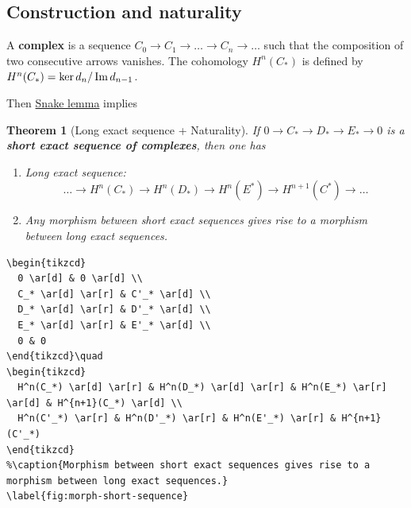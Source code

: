 \documentclass[11pt]{article}
\newtheorem{theorem}{Theorem}
\newcommand{\im}{\mathop{\rm Im}\nolimits}
\begin{document}
\subsection{Construction and naturality}
\label{sec:org1a74cb6}
  A \textbf{complex} is a sequence \(C_0 \longrightarrow C_1 \longrightarrow \dots \longrightarrow C_n
\longrightarrow \dots\) such that the composition of two consecutive arrows vanishes. The
cohomology \(H^n(C_*)\) is defined by \(H^n(C_*) = \ker d_{n}/ \im d_{n-1}\).

Then \href{https://en.wikipedia.org/wiki/Snake\_lemma}{Snake lemma} implies

\begin{theorem}[Long exact sequence + Naturality]
\label{thm:cohomology-complex}
If \(0 \longrightarrow  C_* \longrightarrow D_* \longrightarrow E_* \longrightarrow 0\)
is a \textbf{short exact sequence of complexes}, then one has
\begin{enumerate}
\item Long exact sequence:
\[\dots \longrightarrow  H^n(C_*) \longrightarrow  H^n(D_*) \longrightarrow H^n(E^*) \longrightarrow
   H^{n+1}(C^*) \longrightarrow \dots \]
\item Any morphism between short exact sequences gives rise to a morphism between long exact sequences.
\end{enumerate}
\end{theorem}

\begin{verbatim}
\begin{tikzcd}
  0 \ar[d] & 0 \ar[d] \\
  C_* \ar[d] \ar[r] & C'_* \ar[d] \\
  D_* \ar[d] \ar[r] & D'_* \ar[d] \\
  E_* \ar[d] \ar[r] & E'_* \ar[d] \\
  0 & 0 
\end{tikzcd}\quad 
\begin{tikzcd} 
  H^n(C_*) \ar[d] \ar[r] & H^n(D_*) \ar[d] \ar[r] & H^n(E_*) \ar[r] \ar[d] & H^{n+1}(C_*) \ar[d] \\
  H^n(C'_*) \ar[r] & H^n(D'_*) \ar[r] & H^n(E'_*) \ar[r] & H^{n+1}(C'_*) 
\end{tikzcd}
%\caption{Morphism between short exact sequences gives rise to a morphism between long exact sequences.}
\label{fig:morph-short-sequence}
\end{verbatim}
\end{document}
